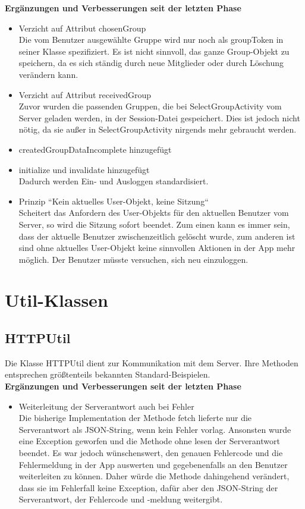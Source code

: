 \documentclass[a4paper]{scrreprt}
\begin{document}
\textbf{Ergänzungen und Verbesserungen seit der letzten Phase}

\begin{itemize}
\item Verzicht auf Attribut chosenGroup \\
Die vom Benutzer ausgewählte Gruppe wird nur noch als groupToken in seiner Klasse spezifiziert. Es ist nicht sinnvoll, das ganze Group-Objekt zu speichern, da es sich ständig durch neue Mitglieder oder durch Löschung verändern kann. 
\item Verzicht auf Attribut receivedGroup \\
Zuvor wurden die passenden Gruppen, die bei SelectGroupActivity vom Server geladen werden, in der Session-Datei gespeichert. Dies ist jedoch nicht nötig, da sie außer in SelectGroupActivity nirgends mehr gebraucht werden.
\item createdGroupDataIncomplete hinzugefügt
\item initialize und invalidate hinzugefügt \\
Dadurch werden Ein- und Ausloggen standardisiert.
\item Prinzip “Kein aktuelles User-Objekt, keine Sitzung“ \\
Scheitert das Anfordern des User-Objekts für den aktuellen Benutzer vom Server, so wird die Sitzung sofort beendet. Zum einen kann es immer sein, dass der aktuelle Benutzer zwischenzeitlich gelöscht wurde, zum anderen ist sind ohne aktuelles User-Objekt keine sinnvollen Aktionen in der App mehr möglich. Der Benutzer müsste versuchen, sich neu einzuloggen.

\end{itemize}

\section{Util-Klassen}

\subsection{HTTPUtil}
Die Klasse HTTPUtil dient zur Kommunikation mit dem Server. Ihre Methoden entsprechen größtenteils bekannten Standard-Beispielen. \\
\textbf{Ergänzungen und Verbesserungen seit der letzten Phase} \\
\begin{itemize}
\item Weiterleitung der Serverantwort auch bei Fehler \\
Die bisherige Implementation der Methode fetch lieferte nur die Serverantwort als JSON-String, wenn kein Fehler vorlag. Ansonsten wurde eine Exception geworfen und die Methode ohne lesen der Serverantwort beendet. Es war jedoch wünschenswert, den genauen Fehlercode und die Fehlermeldung in der App auswerten und gegebenenfalls an den Benutzer weiterleiten zu können. Daher würde die Methode dahingehend verändert, dass sie im Fehlerfall keine Exception, dafür aber den JSON-String der Serverantwort, der Fehlercode und -meldung weitergibt.
\end{itemize}
\end{document}
